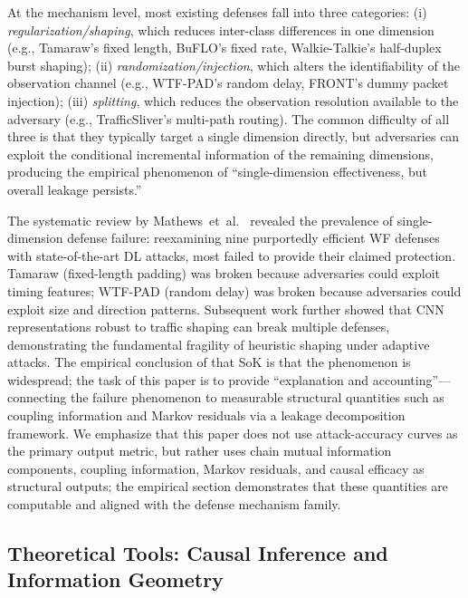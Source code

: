 \documentclass[lettersize,journal]{IEEEtran}
\begin{document}
At the mechanism level, most existing defenses fall into three categories:
(i) \emph{regularization/shaping}, which reduces inter-class differences
in one dimension (e.g., Tamaraw's fixed length, BuFLO's fixed rate,
Walkie-Talkie's half-duplex burst shaping);
(ii) \emph{randomization/injection}, which alters the identifiability of
the observation channel (e.g., WTF-PAD's random delay, FRONT's dummy
packet injection);
(iii) \emph{splitting}, which reduces the observation resolution available
to the adversary (e.g., TrafficSliver's multi-path routing).
The common difficulty of all three is that they typically target a single
dimension directly, but adversaries can exploit the conditional incremental
information of the remaining dimensions, producing the empirical phenomenon
of ``single-dimension effectiveness, but overall leakage persists.''

The systematic review by Mathews~et~al.~\cite{mathews2023sok} revealed
the prevalence of single-dimension defense failure:
reexamining nine purportedly efficient WF defenses with state-of-the-art
DL attacks, most failed to provide their claimed protection.
Tamaraw (fixed-length padding) was broken because adversaries could exploit
timing features; WTF-PAD (random delay) was broken because adversaries could
exploit size and direction patterns.
Subsequent work further showed that CNN representations robust to traffic
shaping can break multiple defenses, demonstrating the fundamental
fragility of heuristic shaping under adaptive attacks.
The empirical conclusion of that SoK is that the phenomenon is widespread;
the task of this paper is to provide ``explanation and accounting''---connecting
the failure phenomenon to measurable structural quantities such as coupling
information and Markov residuals via a leakage decomposition framework.
We emphasize that this paper does not use attack-accuracy curves as the
primary output metric, but rather uses chain mutual information components,
coupling information, Markov residuals, and causal efficacy as structural
outputs; the empirical section demonstrates that these quantities are
computable and aligned with the defense mechanism family.

\subsection{Theoretical Tools: Causal Inference and Information Geometry}
\end{document}

